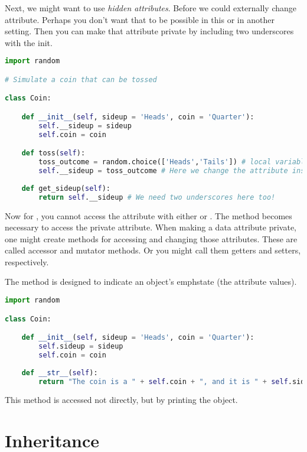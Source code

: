 Next, we might want to use \emph{hidden attributes}. Before we could externally change  attribute. Perhaps you don't want that to be possible in this or in another setting. Then you can make that attribute private by including two underscores with the init.

\begin{lstlisting}[language = Python]
import random 

# Simulate a coin that can be tossed

class Coin: 

    def __init__(self, sideup = 'Heads', coin = 'Quarter'):
        self.__sideup = sideup
        self.coin = coin

    def toss(self):
        toss_outcome = random.choice(['Heads','Tails']) # local variable just like before in defining functions
        self.__sideup = toss_outcome # Here we change the attribute instead of returning a value
        
    def get_sideup(self):
        return self.__sideup # We need two underscores here too!
\end{lstlisting}

Now for , you cannot access the  attribute with either  or . The  method becomes necessary to access the private attribute. When making a data attribute private, one might create methods for accessing and changing those attributes. These are called accessor and mutator methods. Or you might call them getters and setters, respectively.


\smallskip
\noindent The  method is designed to indicate an object's emph{state} (the attribute values). 

\begin{lstlisting}[language = Python]
import random 

class Coin: 

    def __init__(self, sideup = 'Heads', coin = 'Quarter'):
        self.sideup = sideup
        self.coin = coin
        
    def __str__(self):
        return "The coin is a " + self.coin + ", and it is " + self.sideup + "."
\end{lstlisting}

This method is accessed not directly, but by printing the object. 
\section{Inheritance}


